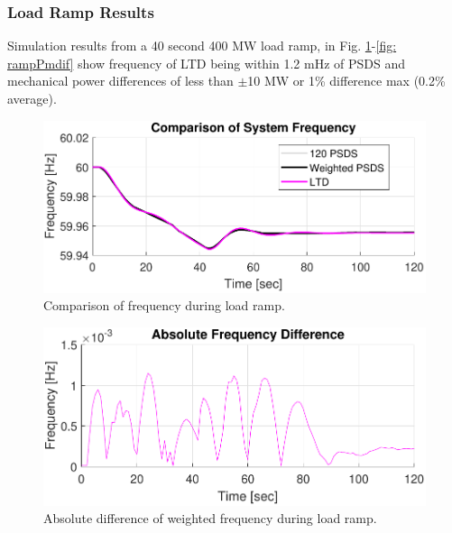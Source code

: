 \subsubsection{Load Ramp Results}
Simulation results from a 40 second 400 MW load ramp, in Fig. \ref{fig: rampFcomp}-\ref{fig: rampPmdif} show frequency of LTD being within 1.2 mHz of PSDS and mechanical power differences of less than $\pm$10 MW or 1\% difference max (0.2\% average).

\begin{figure}[!ht]
	\centering
	\includegraphics[width=\linewidth]{figures/miniWECC3ALTDrampF3}
	\caption{Comparison of frequency during load ramp.}
	\label{fig: rampFcomp}
\end{figure}

\begin{figure}[!ht]
	\centering
	\includegraphics[width=\linewidth]{figures/miniWECC3ALTDrampRelF}
	\caption{Absolute difference of weighted frequency during load ramp.}
	\label{fig: rampFdif}
\end{figure}

